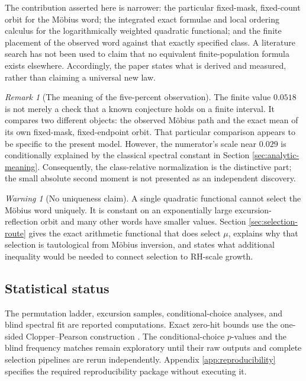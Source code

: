 \documentclass[11pt,reqno]{amsart}
\numberwithin{equation}{section}
\theoremstyle{plain}
\theoremstyle{definition}
\theoremstyle{remark}
\newtheorem{remark}[theorem]{Remark}
\newtheorem{warning}[theorem]{Warning}
\begin{document}
The contribution asserted here is narrower: the particular fixed-mask,
fixed-count orbit for the M\"obius word; the integrated exact formulae and
local ordering calculus for the logarithmically weighted quadratic
functional; and the finite placement of the observed word against that
exactly specified class.  A literature search has not been used to claim that
no equivalent finite-population formula exists elsewhere.  Accordingly, the
paper states what is derived and measured, rather than claiming a universal
new law.

\begin{remark}[The meaning of the five-percent observation]
\label{rem:five-percent-status}
The finite value \(0.0518\) is not merely a check that a known conjecture
holds on a finite interval.  It compares two different objects: the observed
M\"obius path and the exact mean of its own fixed-mask, fixed-endpoint orbit.
That particular comparison appears to be specific to the present model.
However, the numerator's scale near \(0.029\) is conditionally explained by
the classical spectral constant in Section \ref{sec:analytic-meaning}.
Consequently, the class-relative normalization is the distinctive part; the
small absolute second moment is not presented as an independent discovery.
\end{remark}

\begin{warning}[No uniqueness claim]
\label{warn:no-uniqueness-from-quadratic-mass}
A single quadratic functional cannot select the M\"obius word uniquely.  It
is constant on an exponentially large excursion-reflection orbit and many
other words have smaller values.  Section \ref{sec:selection-route} gives the
exact arithmetic functional that does select \(\mu\), explains why that
selection is tautological from M\"obius inversion, and states what additional
inequality would be needed to connect selection to RH-scale growth.
\end{warning}

\subsection{Statistical status}
\label{subsec:statistical-status}

The permutation ladder, excursion samples, conditional-choice analyses, and
blind spectral fit are reported computations.  Exact zero-hit bounds use the
one-sided Clopper--Pearson construction \cite{ClopperPearson1934}.  The
conditional-choice \(p\)-values and the blind frequency matches remain
exploratory until their raw outputs and complete selection pipelines are
rerun independently.  Appendix \ref{app:reproducibility} specifies the
required reproducibility package without executing it.
\end{document}
